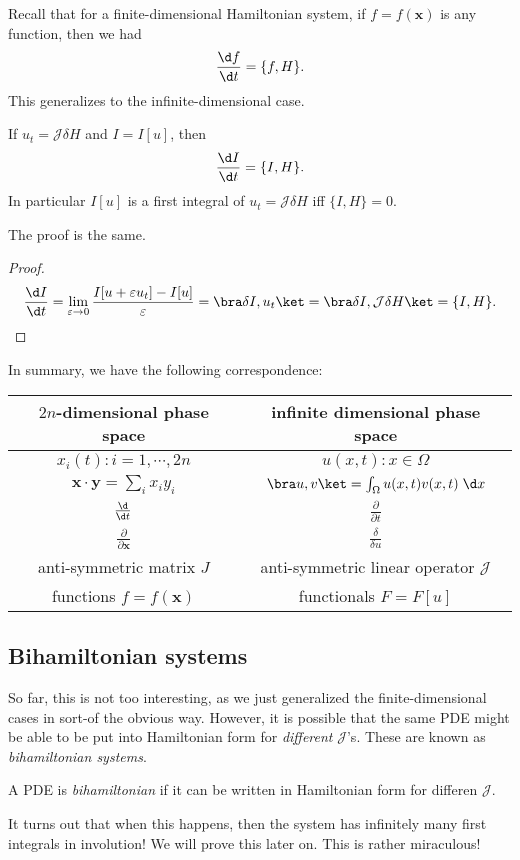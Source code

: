 \documentclass[a4paper]{article}
\begin{document}
Recall that for a finite-dimensional Hamiltonian system, if $f = f(\mathbf{x})$ is any function, then we had
\[
  \frac{\d f}{\d t} = \{f, H\}.
\]
This generalizes to the infinite-dimensional case.
\begin{prop}
  If $u_t = \mathcal{J} \delta H$ and $I = I[u]$, then
  \[
    \frac{\d I}{\d t} = \{I, H\}.
  \]
  In particular $I[u]$ is a first integral of $u_t = \mathcal{J} \delta H$ iff $\{I, H\} = 0$.
\end{prop}

The proof is the same.
\begin{proof}
  \[
    \frac{\d I}{\d t} = \lim_{\varepsilon \to 0} \frac{I[u + \varepsilon u_t] - I[u]}{\varepsilon} = \bra \delta I, u_t\ket = \bra \delta I, \mathcal{J}\delta H\ket = \{I, H\}.
  \]
\end{proof}

In summary, we have the following correspondence:
\begin{center}
  \begin{tabular}{cc}
    \toprule
    $2n$-dimensional phase space & infinite dimensional phase space\\
    \midrule
    $x_i(t): i = 1, \cdots, 2n$ & $u(x, t): x \in \Omega$\\
    $\mathbf{x}\cdot\mathbf{y} = \sum_i x_i y_i$ & $\bra u, v \ket = \int_\Omega u(x, t) v(x, t) \;\d x$\\
    $\frac{\d}{\d t}$ & $\frac{\partial}{\partial t}$\\
    $\frac{\partial}{\partial \mathbf{x}}$ & $\frac{\delta}{\delta u}$\\
    anti-symmetric matrix $J$ & anti-symmetric linear operator $\mathcal{J}$ \\
    functions $f = f(\mathbf{x})$ & functionals $F = F[u]$\\
    \bottomrule
  \end{tabular}
\end{center}


\subsection{Bihamiltonian systems}
So far, this is not too interesting, as we just generalized the finite-dimensional cases in sort-of the obvious way. However, it is possible that the same PDE might be able to be put into Hamiltonian form for \emph{different} $\mathcal{J}$'s. These are known as \emph{bihamiltonian systems}.
\begin{defi}
  A PDE is \emph{bihamiltonian} if it can be written in Hamiltonian form for differen $\mathcal{J}$.
\end{defi}
It turns out that when this happens, then the system has infinitely many first integrals in involution! We will prove this later on. This is rather miraculous!
\end{document}
